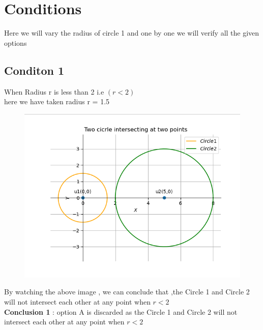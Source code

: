 \documentclass[journal,12pt,twocolumn]{IEEEtran}
\begin{document}
\section{\textbf{Conditions}}

Here we will vary the radius of circle 1 and one by one we will verify all the given options
\subsection{Conditon 1} When Radius r is less than 2 i.e $(r<2)$\\
here we have taken radius r = 1.5
\begin{figure}[h]
    \centering
\includegraphics[width=\columnwidth]{circle1.png}
    \label{fig:my_label}
\end{figure}

By watching the above image , we can conclude that ,the  Circle 1 and Circle 2 will not intersect each other at any point when $r<2$ \\

\textbf{Conclusion 1} : option A is discarded as the Circle 1 and Circle 2 will not intersect each other at any point when $r<2$
\newpage
\end{document}
